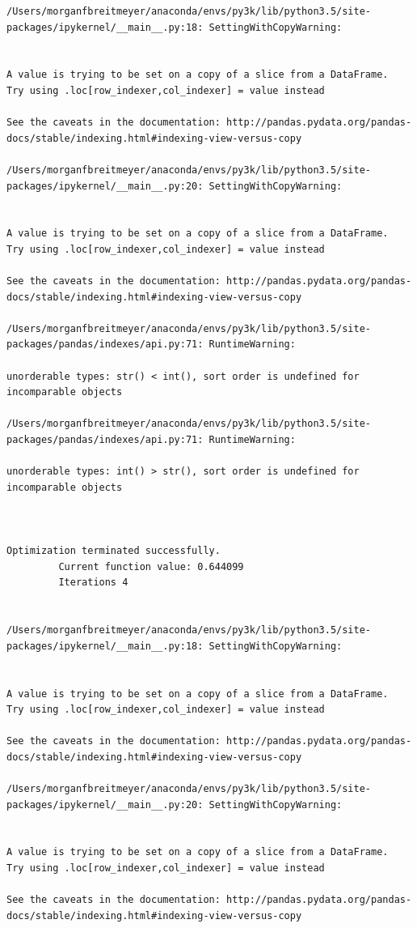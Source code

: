 \begin{lstlisting}
/Users/morganfbreitmeyer/anaconda/envs/py3k/lib/python3.5/site-packages/ipykernel/__main__.py:18: SettingWithCopyWarning:


A value is trying to be set on a copy of a slice from a DataFrame.
Try using .loc[row_indexer,col_indexer] = value instead

See the caveats in the documentation: http://pandas.pydata.org/pandas-docs/stable/indexing.html#indexing-view-versus-copy

/Users/morganfbreitmeyer/anaconda/envs/py3k/lib/python3.5/site-packages/ipykernel/__main__.py:20: SettingWithCopyWarning:


A value is trying to be set on a copy of a slice from a DataFrame.
Try using .loc[row_indexer,col_indexer] = value instead

See the caveats in the documentation: http://pandas.pydata.org/pandas-docs/stable/indexing.html#indexing-view-versus-copy

/Users/morganfbreitmeyer/anaconda/envs/py3k/lib/python3.5/site-packages/pandas/indexes/api.py:71: RuntimeWarning:

unorderable types: str() < int(), sort order is undefined for incomparable objects

/Users/morganfbreitmeyer/anaconda/envs/py3k/lib/python3.5/site-packages/pandas/indexes/api.py:71: RuntimeWarning:

unorderable types: int() > str(), sort order is undefined for incomparable objects



Optimization terminated successfully.
         Current function value: 0.644099
         Iterations 4


/Users/morganfbreitmeyer/anaconda/envs/py3k/lib/python3.5/site-packages/ipykernel/__main__.py:18: SettingWithCopyWarning:


A value is trying to be set on a copy of a slice from a DataFrame.
Try using .loc[row_indexer,col_indexer] = value instead

See the caveats in the documentation: http://pandas.pydata.org/pandas-docs/stable/indexing.html#indexing-view-versus-copy

/Users/morganfbreitmeyer/anaconda/envs/py3k/lib/python3.5/site-packages/ipykernel/__main__.py:20: SettingWithCopyWarning:


A value is trying to be set on a copy of a slice from a DataFrame.
Try using .loc[row_indexer,col_indexer] = value instead

See the caveats in the documentation: http://pandas.pydata.org/pandas-docs/stable/indexing.html#indexing-view-versus-copy


\end{lstlisting}
